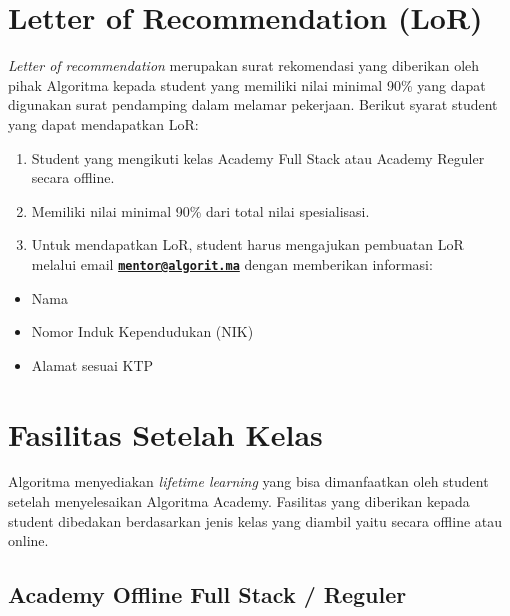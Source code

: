 \documentclass[
]{book}
\providecommand{\tightlist}{%
  \setlength{\itemsep}{0pt}\setlength{\parskip}{0pt}}
\begin{document}
\hypertarget{letter-of-recommendation-lor}{%
\section{Letter of Recommendation (LoR)}\label{letter-of-recommendation-lor}}

\emph{Letter of recommendation} merupakan surat rekomendasi yang diberikan oleh pihak Algoritma kepada student yang memiliki nilai minimal 90\% yang dapat digunakan surat pendamping dalam melamar pekerjaan. Berikut syarat student yang dapat mendapatkan LoR:

\begin{enumerate}
\def\labelenumi{\arabic{enumi}.}
\tightlist
\item
  Student yang mengikuti kelas Academy Full Stack atau Academy Reguler secara offline.
\item
  Memiliki nilai minimal 90\% dari total nilai spesialisasi.
\item
  Untuk mendapatkan LoR, student harus mengajukan pembuatan LoR melalui email \textbf{\href{mailto:mentor@algorit.ma}{\nolinkurl{mentor@algorit.ma}}} dengan memberikan informasi:
\end{enumerate}

\begin{itemize}
\tightlist
\item
  Nama
\item
  Nomor Induk Kependudukan (NIK)
\item
  Alamat sesuai KTP
\end{itemize}

\hypertarget{fasilitas-setelah-kelas}{%
\section{Fasilitas Setelah Kelas}\label{fasilitas-setelah-kelas}}

Algoritma menyediakan \emph{lifetime learning} yang bisa dimanfaatkan oleh student setelah menyelesaikan Algoritma Academy. Fasilitas yang diberikan kepada student dibedakan berdasarkan jenis kelas yang diambil yaitu secara offline atau online.

\hypertarget{academy-offline-full-stack-reguler}{%
\subsection{Academy Offline Full Stack / Reguler}\label{academy-offline-full-stack-reguler}}
\end{document}
